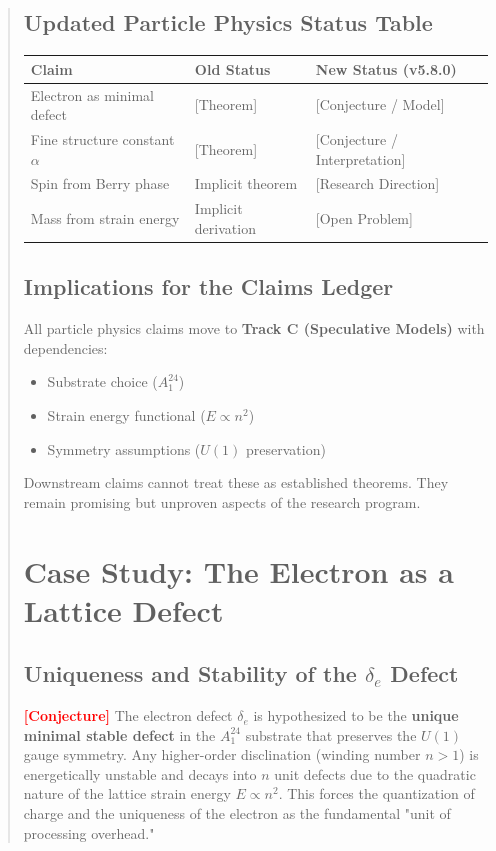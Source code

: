 \documentclass[11pt,titlepage]{article}
\newcommand{\tagconj}{\textcolor{red}{\textbf{[Conjecture]}} }
\begin{document}
\begin{abstract}
\subsection{Updated Particle Physics Status Table}
\begin{center}
\begin{tabular}{p{}p{}p{}}
\textbf{Claim} & \textbf{Old Status} & \textbf{New Status (v5.8.0)} \\ \hline
Electron as minimal defect & [Theorem] & [Conjecture / Model] \\
Fine structure constant $\alpha$ & [Theorem] & [Conjecture / Interpretation] \\
Spin from Berry phase & Implicit theorem & [Research Direction] \\
Mass from strain energy & Implicit derivation & [Open Problem] \\
\end{tabular}
\end{center}

\subsection{Implications for the Claims Ledger}
All particle physics claims move to \textbf{Track C (Speculative Models)} with dependencies:
\begin{itemize}
\item Substrate choice ($A_1^{24}$)
\item Strain energy functional ($E \propto n^2$)
\item Symmetry assumptions ($U(1)$ preservation)
\end{itemize}

Downstream claims cannot treat these as established theorems. They remain promising but unproven aspects of the research program.

\section{Case Study: The Electron as a Lattice Defect}
\subsection{Uniqueness and Stability of the $\delta_e$ Defect}
\tagconj The electron defect $\delta_e$ is hypothesized to be the \textbf{unique minimal stable defect} in the $A_1^{24}$ substrate that preserves the $U(1)$ gauge symmetry. Any higher-order disclination (winding number $n > 1$) is energetically unstable and decays into $n$ unit defects due to the quadratic nature of the lattice strain energy $E \propto n^2$. This forces the quantization of charge and the uniqueness of the electron as the fundamental "unit of processing overhead."


\end{abstract}
\end{document}
